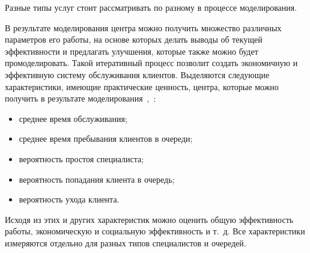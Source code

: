 Разные типы услуг стоит рассматривать по разному в процессе моделирования.

В результате моделирования центра можно получить множество различных параметров его работы, на основе которых делать выводы об текущей эффективности и предлагать улучшения, которые также можно будет промоделировать. Такой итеративный процесс позволит создать экономичную и эффективную систему обслуживания клиентов. Выделяются следующие характеристики, имеющие практические ценность, центра, которые можно получить в результате моделирования~\cite{har1},~\cite{har2}:
\begin{itemize}[label=---]
	\item среднее время обслуживания;
	\item среднее время пребывания клиентов в очереди;
	\item вероятность простоя специалиста;
	\item вероятность попадания клиента в очередь;
	\item вероятность ухода клиента.
\end{itemize}

Исходя из этих и других характеристик можно оценить общую эффективность работы, экономическую и социальную эффективность и т.~д. Все характеристики измеряются отдельно для разных типов специалистов и очередей. 